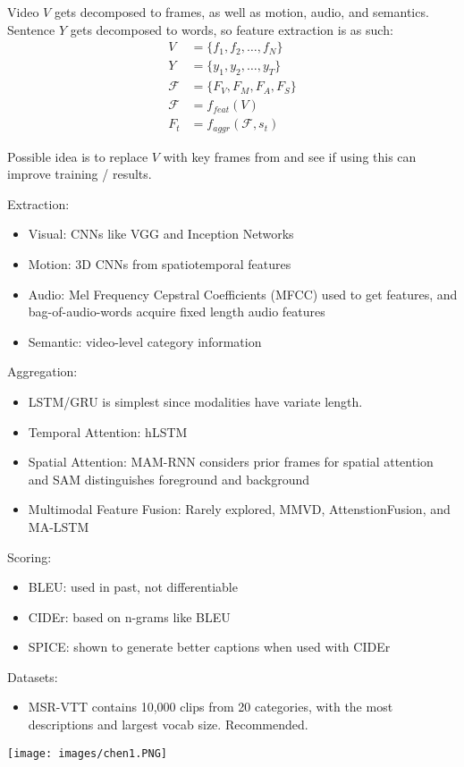 \documentclass[conference]{IEEEtran}
\begin{document}
Video $V$ gets decomposed to frames, as well as motion, audio, and semantics. Sentence $Y$ gets decomposed to words, so feature extraction is as such:
\begin{align}
    V &= \{f_1,f_2,\ldots,f_N\} \\
    Y &= \{y_1,y_2,\ldots,y_T\} \\
    \mathcal{F} &= \{F_V,F_M,F_A,F_S\} \\
    \mathcal{F} &= f_{feat}(V) \\
    F_t &= f_{aggr}(\mathcal{F},s_t)
\end{align}

Possible idea is to replace $V$ with key frames from \cite{4604096} and see if using this can improve training / results.

Extraction:
\begin{itemize}
    \item Visual: CNNs like VGG and Inception Networks
    \item Motion: 3D CNNs from spatiotemporal features
    \item Audio: Mel Frequency Cepstral Coefficients (MFCC) used to get features, and bag-of-audio-words acquire fixed length audio features
    \item Semantic: video-level category information
\end{itemize}

Aggregation:
\begin{itemize}
    \item LSTM/GRU is simplest since modalities have variate length.
    \item Temporal Attention: hLSTM
    \item Spatial Attention: MAM-RNN considers prior frames for spatial attention and SAM distinguishes foreground and background
    \item Multimodal Feature Fusion: Rarely explored, MMVD, AttenstionFusion, and MA-LSTM
\end{itemize}

Scoring:
\begin{itemize}
    \item BLEU: used in past, not differentiable
    \item CIDEr: based on n-grams like BLEU
    \item SPICE: shown to generate better captions when used with CIDEr
\end{itemize}

Datasets:
\begin{itemize}
    \item MSR-VTT contains 10,000 clips from 20 categories, with the most descriptions and largest vocab size. Recommended.
\end{itemize}

\texttt{[image: images/chen1.PNG]}
\cite{chen2019deep}



\end{document}
